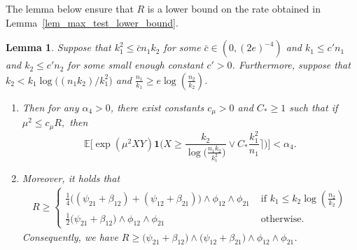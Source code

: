 \documentclass{article}
\newcommand{\EE}{\mathbb{E}}
\newcommand{\one}{\mathbf{1}}
\newcommand{\Ct}{C_{*}}
\newtheorem{lemma}{Lemma}
\begin{document}
The lemma below ensure that $R$ is a lower bound on the rate obtained in Lemma~\ref{lem_max_test_lower_bound}.
\begin{lemma}\label{lem_simplification_rate_max_test}
    Suppose that $k_1^2 \leq \bar{c}n_1k_2$ for some $\bar{c} \in (0,(2e)^{-4})$ and $k_1 \leq c'n_1$ and $k_2 \leq c' n_2$ for some small enough constant $c'>0$. Furthermore, suppose that $k_2 < k_1\log\big((n_1k_2)/k_1^2\big)$ and $\frac{n_1}{k_1} \geq e \log\left(\frac{n_2}{k_2}\right)$. 
    \begin{enumerate}
        \item Then for any $\alpha_4 > 0$, there exist constants $c_\mu > 0$ and $C_* \geq 1$ such that if $\mu^2 \leq c_\mu R,$ then 
    \[\EE\Big[\exp(\mu^2XY)\one\Big(X \geq \frac{k_2}{\log\big(\frac{n_1k_2}{k_1^2}\big)} \lor  \Ct \frac{k_1^2}{n_1}\Big\rceil\Big)\Big] < \alpha_4.\]
    \item Moreover, it holds that 
    \begin{align*}
        R \geq \begin{cases}
            \frac{1}{4}\big((\psi_{21}+\beta_{12}) + (\psi_{12} + \beta_{21})\big) \land \phi_{12} \land \phi_{21}& \text{ if } k_1 \leq k_2\log\left(\frac{n_2}{k_2}\right)\\
            \frac{1}{2}\big(\psi_{21} + \beta_{12}\big) \land \phi_{12} \land \phi_{21} & \text{ otherwise.}
        \end{cases}
    \end{align*}
    Consequently, we have $R \geq \big(\psi_{21} + \beta_{12}\big) \land \big(\psi_{12} + \beta_{21}\big) \land \phi_{12} \land \phi_{21}$.
    \end{enumerate}
\end{lemma}
\end{document}
